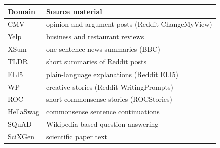 \begin{tabular}{ll}
\toprule
Domain & Source material \\
\midrule
CMV & opinion and argument posts (Reddit ChangeMyView) \\
Yelp & business and restaurant reviews \\
XSum & one-sentence news summaries (BBC) \\
TLDR & short summaries of Reddit posts \\
ELI5 & plain-language explanations (Reddit ELI5) \\
WP & creative stories (Reddit WritingPrompts) \\
ROC & short commonsense stories (ROCStories) \\
HellaSwag & commonsense sentence continuations \\
SQuAD & Wikipedia-based question answering \\
SciXGen & scientific paper text \\
\bottomrule
\end{tabular}
